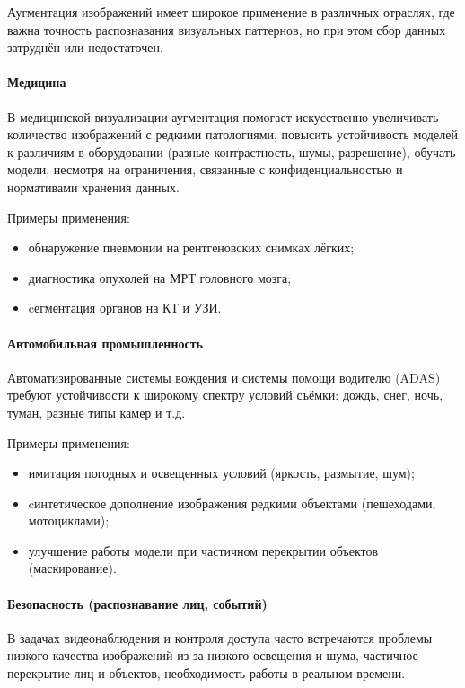 Аугментация изображений имеет широкое применение в различных отраслях, где важна точность распознавания визуальных паттернов, но при этом сбор данных затруднён или недостаточен.

\paragraph{Медицина}

В медицинской визуализации аугментация помогает искусственно увеличивать количество изображений с редкими патологиями, повысить устойчивость моделей к различиям в оборудовании (разные контрастность, шумы, разрешение), обучать модели, несмотря на ограничения, связанные с конфиденциальностью и нормативами хранения данных.

Примеры применения:

\begin{itemize}
	\item обнаружение пневмонии на рентгеновских снимках лёгких;
	\item диагностика опухолей на МРТ головного мозга;
	\item cегментация органов на КТ и УЗИ.
\end{itemize}

\paragraph{Автомобильная промышленность}

Автоматизированные системы вождения и системы помощи водителю (ADAS) требуют устойчивости к широкому спектру условий съёмки: дождь, снег, ночь, туман, разные типы камер и т.д.

Примеры применения:

\begin{itemize}
	\item имитация погодных и освещенных условий (яркость, размытие, шум);
	\item cинтетическое дополнение изображения редкими объектами (пешеходами, мотоциклами);
	\item улучшение работы модели при частичном перекрытии объектов (маскирование).
\end{itemize}

\paragraph{Безопасность (распознавание лиц, событий)}

В задачах видеонаблюдения и контроля доступа часто встречаются проблемы низкого качества изображений из-за низкого освещения и шума, частичное перекрытие лиц и объектов, необходимость работы в реальном времени.

